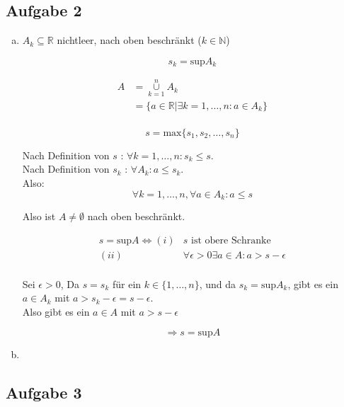 \documentclass{article}
\begin{document}
\subsection*{Aufgabe 2}

\begin{enumerate}[a)]
\item
  $A_k \subseteq \mathbb{R}$ nichtleer, nach oben beschränkt ($k \in \mathbb{N}$)

  \[
    s_k = \text{sup} A_k
  \]

  \begin{align*}
    A &= \overset{n}{\underset{k = 1}\cup} A_k \\
      &= \{ a \in \mathbb{R} | \exists k = 1, \ldots, n \colon a \in A_k \} \\
  \end{align*}

  \[
    s = \text{max} \{ s_1, s_2, \ldots, s_n\}
  \]

  Nach Definition von $s$ : $\forall k = 1, \ldots, n \colon s_k \leq s$. \\
  Nach Definition von $s_k$ : $\forall A_k \colon a \leq s_k$. \\

  Also:
  \[
    \forall k = 1, \ldots, n, \forall a \in A_k \colon a \leq s
  \]

  Also ist $A \ne \emptyset$ nach oben beschränkt.

  \begin{align*}
    s = \text{sup} A \iff (i) &s \text{ ist obere Schranke} \\
                         (ii) & \forall \epsilon > 0 \exists a \in A \colon a > s - \epsilon \\ 
  \end{align*}

  Sei $\epsilon > 0$, Da $s = s_k$ für ein $k \in \{ 1, \ldots, n \}$, und da $s_k = \text{sup} A_k$,
  gibt es ein $a \in A_k$ mit $a > s_k - \epsilon = s - \epsilon$. \\

  Also gibt es ein $a \in A$ mit $a > s - \epsilon$

  \[
    \Rightarrow s = \text{sup} A
  \]

\item
\end{enumerate}

\subsection*{Aufgabe 3}
\end{document}
